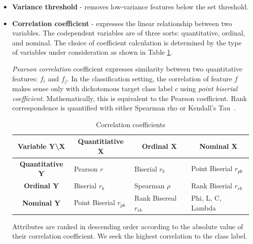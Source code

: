 \begin{itemize}
\item \textbf{Variance threshold} - removes low-variance features below the set threshold.

\item \textbf{Correlation coefficient} - expresses the linear relationship between two variables. The codependent variables are of three sorts: quantitative, ordinal, and nominal. The choice of coefficient calculation is determined by the type of variables under consideration as shown in Table \ref{tab:corr-coef}.


\emph{Pearson correlation} coefficient expresses similarity between two quantitative features: $f_i$ and $f_j$. In the classification setting, the correlation of feature $f$ makes sense only with dichotomous target class label $c$ using \emph{point biserial coefficient}. Mathematically, this is equivalent to the Pearson coefficient. Rank correspondence is quantified with either Spearman rho or Kendall's Tau~\cite{calkins_more_2005}.

\begin{table}[ht]
\renewcommand{\arraystretch}{1.5}
\begin{adjustbox}{width=\columnwidth,center}
\begin{tabular}{|c|l|l|l|}
\hline
\textbf{Variable Y\textbackslash{}X} & \multicolumn{1}{c|}{\textbf{Quantitiative X}} & \multicolumn{1}{c|}{\textbf{Ordinal X}} & \multicolumn{1}{c|}{\textbf{Nominal X}} \\ \hline
\textbf{Quantitative Y}              & Pearson $r$                                   & Biserial $r_b$                          & Point Biserial $r_{pb}$                 \\ \hline
\textbf{Ordinal Y}                   & Biserial $r_b$                                & Spearman $\rho$    & Rank Biserial $r_{rb}$                  \\ \hline
\textbf{Nominal Y}                   & Point Biserial $r_{pb}$                       & Rank Bisereal $r_{rb}$                  & Phi, L, C, Lambda                       \\ \hline
\end{tabular}
\end{adjustbox}
\caption{Correlation coefficients}
\label{tab:corr-coef}
\end{table}

Attributes are ranked in descending order according to the absolute value of their correlation coefficient. We seek the highest correlation to the class label.


\end{itemize}
